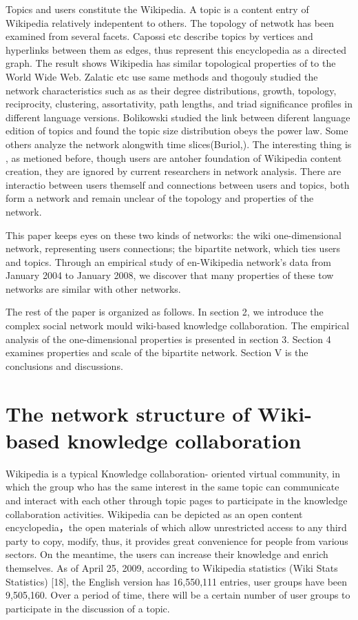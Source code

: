 \documentclass{elsarticle}
\begin{document}
Topics and users constitute the Wikipedia. A topic is a content entry
of Wikipedia relatively indepentent to others. The topology of netwotk  has
been examined
 from several facets. Capossi etc describe topics by vertices and hyperlinks between them as edges, thus represent
this encyclopedia as a directed graph. The result shows Wikipedia has
similar topological properties of to the World Wide Web. Zalatic etc use
same methods and thogouly studied the network characteristics such as as their degree distributions, growth, topology, reciprocity, clustering, assortativity, path lengths, and triad
signiﬁcance proﬁles in different language versions. Bolikowski
studied the link between diferent language edition of topics and found
the topic size distribution obeys the power law. Some others analyze
the network alongwith time slices(Buriol,). The interesting thing is
, as metioned before, though users are antoher foundation of Wikipedia
content creation, they are ignored by current researchers in network
analysis. There are interactio between users themself and connections
between users and topics, both form a network and remain unclear of the topology and
properties of the network.    



 This paper keeps eyes  on these two kinds of networks: the wiki
 one-dimensional network, representing users connections; the
 bipartite network, which ties users and topics. Through an
 empirical study of en-Wikipedia network’s data  from January
 2004 to January 2008, we discover that many properties of these tow networks are similar with other networks. 

The rest of the paper is organized as follows. In section 2, we
introduce the complex social network mould wiki-based knowledge
collaboration. The empirical analysis of the one-dimensional
properties is presented in section 3. Section 4 examines properties
and scale of the  bipartite network. Section V is
the conclusions and discussions.

\section{The network structure of Wiki-based knowledge collaboration}
\label{sec:netw-struct-wiki}

Wikipedia is a typical Knowledge collaboration- oriented virtual
community, in which the group who has the same interest in the same
topic can communicate and interact with each other through topic pages
to participate in the knowledge collaboration activities. Wikipedia
can be depicted as an open content encyclopedia，the open materials of
which allow unrestricted access to any third party to copy, modify,
thus, it  provides great convenience for people from various
sectors. On the meantime, the users can increase their knowledge and
enrich themselves. As of April 25, 2009, according to Wikipedia
statistics (Wiki Stats Statistics) [18], the English version has
16,550,111 entries, user groups have been 9,505,160. Over a period of time, there will be a certain number of user groups to participate in the discussion of a topic.
\end{document}
